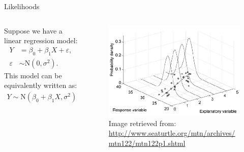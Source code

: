 \documentclass{beamer}\usepackage[]{graphicx}\usepackage[]{color}
\begin{document}
\watermarkoff %

\begin{frame}{Likelihoods}
  
    \begin{columns}
    \begin{column}{0.5\textwidth}
      
      Suppose we have a linear regression model:
      \begin{align*}
        Y &= \beta_0 + \beta_1 X + \varepsilon,\\[6pt]
        \varepsilon &\sim \text{N}\left( 0, \sigma^2 \right).
      \end{align*}
      This model can be equivalently written as:
      \begin{align*}
        Y \sim \text{N} \left( \beta_0 + \beta_1 X, \sigma^2 \right)
      \end{align*}
      
    \end{column}
    \begin{column}{0.5\textwidth}

      \begin{figure}
        \includegraphics[width = \textwidth]{figures/conditional_density_figure.png}\\
        \va
        \tiny{Image retrieved from:
          \url{http://www.seaturtle.org/mtn/archives/mtn122/mtn122p1.shtml}}
      \end{figure}
      
    \end{column}
    \end{columns}
    
\end{frame}
\end{document}
